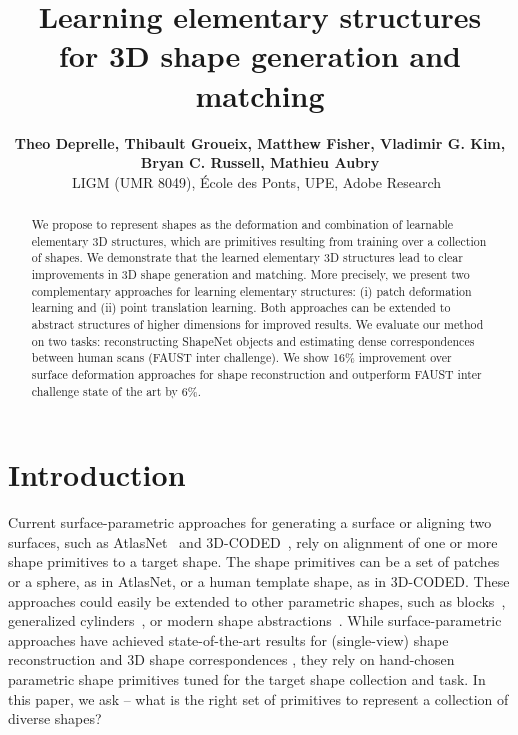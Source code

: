 \documentclass{article}
\title{ Learning elementary structures \\ for 3D shape generation and matching}
\author{
\textbf{Theo Deprelle, Thibault Groueix, Matthew Fisher, Vladimir G. Kim, }\\\textbf{Bryan C. Russell, Mathieu Aubry}\\
 LIGM (UMR 8049), \'Ecole des Ponts, UPE, Adobe Research\
}
\begin{document}
\maketitle
\vspace{-1em}

\begin{abstract}
{We propose to represent shapes as the deformation and combination of learnable elementary 3D structures, which are primitives resulting from training over a collection of shapes. We demonstrate that the learned elementary 3D structures lead to clear improvements in 3D shape generation and matching.
More precisely, we present two complementary approaches for learning elementary structures:
(i) patch deformation learning and (ii) point translation learning. Both approaches can be extended to abstract structures of higher dimensions for improved results.
We evaluate our method on two tasks: reconstructing ShapeNet objects and estimating dense correspondences between human scans (FAUST inter challenge). We show 16\% improvement over surface deformation approaches for shape reconstruction and outperform FAUST inter challenge state of the art by 6\%.
}


\end{abstract}

\section{Introduction}
\label{sec:intro}

Current surface-parametric approaches for generating a surface or aligning two surfaces, such as AtlasNet~\cite{groueix2018} and 3D-CODED~\cite{groueix2018b}, rely on alignment of one or more shape primitives to a target shape. 
The shape primitives can be a set of patches or a sphere, as in AtlasNet, or a human template shape, as in 3D-CODED. These approaches could easily be extended to other parametric shapes, such as blocks~\cite{roberts1963machine}, generalized cylinders~\cite{binford1971visual}, or modern shape abstractions~\cite{li2017grass,sharma2018csgnet,abstractionTulsiani17}. 
While surface-parametric approaches have achieved state-of-the-art results for (single-view) shape reconstruction \cite{groueix2018} and 3D shape correspondences \cite{groueix2018b}, they rely on hand-chosen parametric shape primitives tuned for the target shape collection and task. 
In this paper, we ask -- what is the right set of primitives to represent a collection of diverse shapes? 
\end{document}
